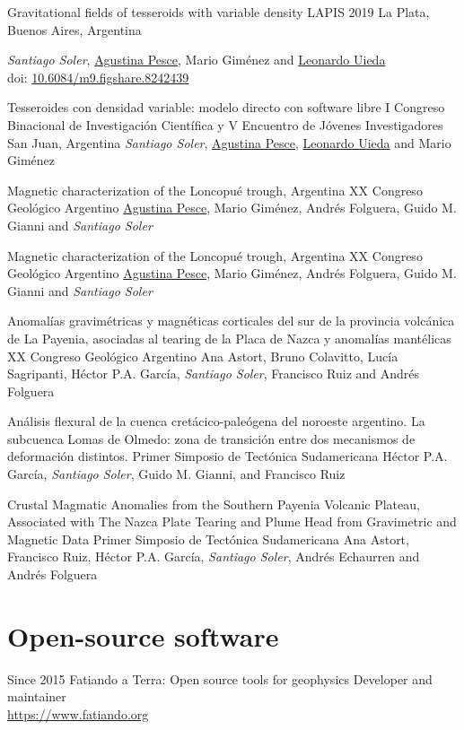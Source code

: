 \documentclass[a4paper,12pt,sans]{moderncv/moderncv}
\newcommand{\me}{\emph{Santiago Soler}}
\newcommand{\agustina}{\href{https://aguspesce.github.io}{Agustina Pesce}}
\newcommand{\guido}{Guido M. Gianni}
\newcommand{\leo}{\href{https://www.leouieda.com}{Leonardo Uieda}}
\newcommand{\mario}{Mario Giménez}
\newcommand{\folguera}{Andrés Folguera}
\newcommand{\pichu}{Héctor P.A. García}
\newcommand{\paco}{Francisco Ruiz}
\newcommand{\doi}[1]{
    \href{https://doi.org/#1}{#1}
}
\begin{document}
{Gravitational fields of tesseroids with variable density}
{LAPIS 2019}
{La Plata, Buenos Aires, Argentina}
{}
{
    \me{}, \agustina{}, \mario{} and \leo{}
    \\
    doi: \doi{10.6084/m9.figshare.8242439}
}

{Tesseroides con densidad variable: modelo directo con software libre}
{
    I Congreso Binacional de Investigación Científica y V Encuentro de Jóvenes
    Investigadores
}
{San Juan, Argentina}
{}
{\me{}, \agustina{}, \leo{} and \mario{}}

{Magnetic characterization of the Loncopué trough, Argentina}
{XX Congreso Geológico Argentino}
{}
{}
{\agustina{}, \mario{}, \folguera{}, \guido{} and \me{}}

{Magnetic characterization of the Loncopué trough, Argentina}
{XX Congreso Geológico Argentino}
{}
{}
{\agustina{}, \mario{}, \folguera{}, \guido{} and \me{}}

{
    Anomalías gravimétricas y magnéticas corticales del sur de la provincia
    volcánica de La Payenia, asociadas al tearing de la Placa de Nazca
    y anomalías mantélicas
}
{XX Congreso Geológico Argentino}
{}
{}
{
    Ana Astort, Bruno Colavitto, Lucía Sagripanti, \pichu{}, \me{}, \paco{}
    and \folguera{}
}

{
   Análisis flexural de la cuenca cretácico-paleógena del noroeste
   argentino. La subcuenca Lomas de Olmedo: zona de transición entre dos
   mecanismos de deformación distintos.
}
{Primer Simposio de Tectónica Sudamericana}
{}
{}
{\pichu{}, \me{}, \guido{}, and \paco{}}

{
    Crustal Magmatic Anomalies from the Southern Payenia Volcanic Plateau,
    Associated with The Nazca Plate Tearing and Plume Head from Gravimetric
    and Magnetic Data
}
{Primer Simposio de Tectónica Sudamericana}
{}
{}
{Ana Astort, \paco{}, \pichu{}, \me{}, Andrés Echaurren and \folguera{}}


\section{Open-source software}

\cventry
{Since 2015}
{Fatiando a Terra: Open source tools for geophysics}
{}
{}
{}
{
    Developer and maintainer
    \\
    \url{https://www.fatiando.org}
}
\end{document}
